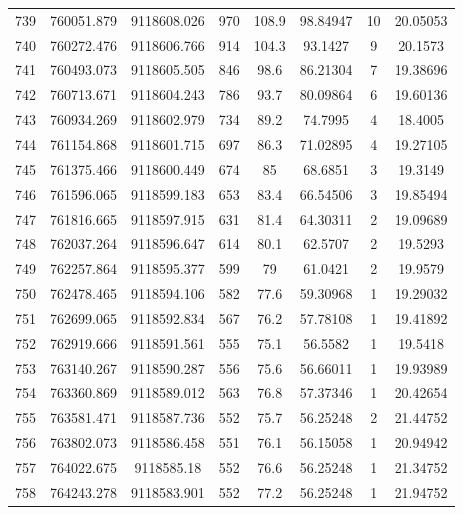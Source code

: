 \begin{longtable}{cccccccc}
739  & 760051.879      & 9118608.026      & 970     & 108.9 & 98.84947 & 10 & 20.05053 \\
740  & 760272.476      & 9118606.766      & 914     & 104.3 & 93.1427  & 9  & 20.1573  \\
741  & 760493.073      & 9118605.505      & 846     & 98.6  & 86.21304 & 7  & 19.38696 \\
742  & 760713.671      & 9118604.243      & 786     & 93.7  & 80.09864 & 6  & 19.60136 \\
743  & 760934.269      & 9118602.979      & 734     & 89.2  & 74.7995  & 4  & 18.4005  \\
744  & 761154.868      & 9118601.715      & 697     & 86.3  & 71.02895 & 4  & 19.27105 \\
745  & 761375.466      & 9118600.449      & 674     & 85    & 68.6851  & 3  & 19.3149  \\
746  & 761596.065      & 9118599.183      & 653     & 83.4  & 66.54506 & 3  & 19.85494 \\
747  & 761816.665      & 9118597.915      & 631     & 81.4  & 64.30311 & 2  & 19.09689 \\
748  & 762037.264      & 9118596.647      & 614     & 80.1  & 62.5707  & 2  & 19.5293  \\
749  & 762257.864      & 9118595.377      & 599     & 79    & 61.0421  & 2  & 19.9579  \\
750  & 762478.465      & 9118594.106      & 582     & 77.6  & 59.30968 & 1  & 19.29032 \\
751  & 762699.065      & 9118592.834      & 567     & 76.2  & 57.78108 & 1  & 19.41892 \\
752  & 762919.666      & 9118591.561      & 555     & 75.1  & 56.5582  & 1  & 19.5418  \\
753  & 763140.267      & 9118590.287      & 556     & 75.6  & 56.66011 & 1  & 19.93989 \\
754  & 763360.869      & 9118589.012      & 563     & 76.8  & 57.37346 & 1  & 20.42654 \\
755  & 763581.471      & 9118587.736      & 552     & 75.7  & 56.25248 & 2  & 21.44752 \\
756  & 763802.073      & 9118586.458      & 551     & 76.1  & 56.15058 & 1  & 20.94942 \\
757  & 764022.675      & 9118585.18       & 552     & 76.6  & 56.25248 & 1  & 21.34752 \\
758  & 764243.278      & 9118583.901      & 552     & 77.2  & 56.25248 & 1  & 21.94752 \\

\end{longtable}
